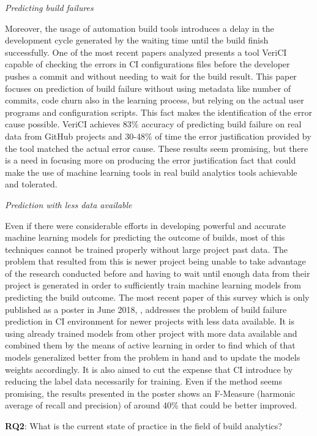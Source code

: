 \documentclass[]{book}
\begin{document}
\emph{Predicting build failures}

Moreover, the usage of automation build tools introduces a delay in the
development cycle generated by the waiting time until the build finish
successfully. One of the most recent papers analyzed
\citet{santolucito2018statically} presents a tool VeriCI capable of
checking the errors in CI configurations files before the developer
pushes a commit and without needing to wait for the build result. This
paper focuses on prediction of build failure without using metadata like
number of commits, code churn also in the learning process, but relying
on the actual user programs and configuration scripts. This fact makes
the identification of the error cause possible. VeriCI achieves 83\%
accuracy of predicting build failure on real data from GitHub projects
and 30-48\% of time the error justification provided by the tool matched
the actual error cause. These results seem promising, but there is a
need in focusing more on producing the error justification fact that
could make the use of machine learning tools in real build analytics
tools achievable and tolerated.

\emph{Prediction with less data available}

Even if there were considerable efforts in developing powerful and
accurate machine learning models for predicting the outcome of builds,
most of this techniques cannot be trained properly without large project
past data. The problem that resulted from this is newer project being
unable to take advantage of the research conducted before and having to
wait until enough data from their project is generated in order to
sufficiently train machine learning models from predicting the build
outcome. The most recent paper of this survey which is only published as
a poster in June 2018, \citet{ni2018acona}, addresses the problem of
build failure prediction in CI environment for newer projects with less
data available. It is using already trained models from other project
with more data available and combined them by the means of active
learning in order to find which of that models generalized better from
the problem in hand and to update the models weights accordingly. It is
also aimed to cut the expense that CI introduce by reducing the label
data necessarily for training. Even if the method seems promising, the
results presented in the poster shows an F-Measure (harmonic average of
recall and precision) of around 40\% that could be better improved.

\textbf{RQ2}: What is the current state of practice in the field of
build analytics?
\end{document}

